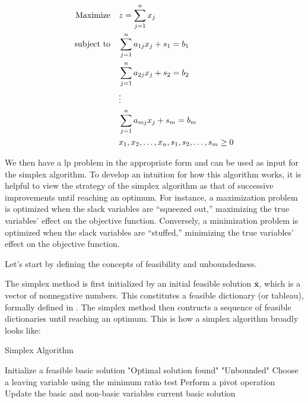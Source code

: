 \begin{align}
    \text{Maximize} \quad   & z = \sum_{j=1}^{n} x_j \notag                            \\
    \text{subject to} \quad & \sum_{j=1}^{n} a_{1j} x_j + s_1 = b_1 \notag               \\
                            & \sum_{j=1}^{n} a_{2j} x_j + s_2 = b_2 \notag               \\
                            & \vdots \notag                                            \\
                            & \sum_{j=1}^{n} a_{mj} x_j + s_m = b_m \label{LP_Problem_Comp}   \\
                            & x_1, x_2, \dots, x_n, s_1, s_2, \dots, s_m \geq 0 \notag
\end{align}

We then have a \gls{lp} problem in the appropriate form and can be used as input for
the simplex algorithm. To develop an intuition for how this algorithm works,
it is helpful to view the strategy of the simplex algorithm as that of 
successive improvements until reaching an optimum. For instance, a maximization problem is optimized when the slack 
variables are “squeezed out,” maximizing the true variables’ effect on the objective 
function. Conversely, a minimization problem is optimized when the slack variables 
are “stuffed,” minimizing the true variables’ effect on the objective function.

Let's start by defining the concepts of feasibility and unboundedness.

The simplex method is first initialized by 
an initial feasible solution $\mathbf{\bar{x}}$, which is a vector of nonnegative numbers.
This constitutes a feasible dictionary (or tableau), formally defined in \parencite{chvatal1983linear}. 
The simplex method then contructs a sequence of feasible dictionaries until reaching an optimum. 
This is how a simplex algorithm broadly looks like:

\begin{algorithm}
    \caption{Simplex Algorithm}
    \begin{algorithmic}[1]
        \State Initialize a feasible basic solution
            \State \Return "Optimal solution found"
        \EndIf
            \State \Return "Unbounded"
        \EndIf
        \State Choose a leaving variable using the minimum ratio test
        \State Perform a pivot operation
        \State Update the basic and non-basic variables
        \State \Return current basic solution
    \EndProcedure
    \end{algorithmic}
    \end{algorithm}


